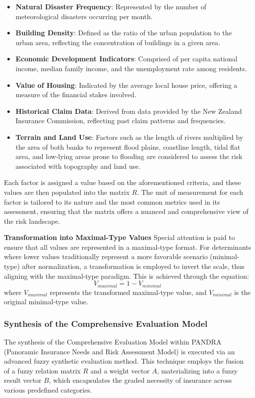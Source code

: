 \documentclass{mcmthesis}
\begin{document}
\begin{itemize}
    \item \textbf{Natural Disaster Frequency}: Represented by the number of meteorological disasters occurring per month.
    \item \textbf{Building Density}: Defined as the ratio of the urban population to the urban area, reflecting the concentration of buildings in a given area.
    \item \textbf{Economic Development Indicators}: Comprised of per capita national income, median family income, and the unemployment rate among residents.
    \item \textbf{Value of Housing}: Indicated by the average local house price, offering a measure of the financial stakes involved.
    \item \textbf{Historical Claim Data}: Derived from data provided by the New Zealand Insurance Commission, reflecting past claim patterns and frequencies.
    \item \textbf{Terrain and Land Use}: Factors such as the length of rivers multiplied by the area of both banks to represent flood plains, coastline length, tidal flat area, and low-lying areas prone to flooding are considered to assess the risk associated with topography and land use.
\end{itemize}

Each factor is assigned a value based on the aforementioned criteria, and these values are then populated into the matrix \( R \). The unit of measurement for each factor is tailored to its nature and the most common metrics used in its assessment, ensuring that the matrix offers a nuanced and comprehensive view of the risk landscape.

\textbf{Transformation into Maximal-Type Values}
Special attention is paid to ensure that all values are represented in a maximal-type format. For determinants where lower values traditionally represent a more favorable scenario (minimal-type) after normalization, a transformation is employed to invert the scale, thus aligning with the maximal-type paradigm. This is achieved through the equation:
\begin{equation}
V_{maximal} = 1 - V_{minimal}
\end{equation}
where $V_{maximal}$ represents the transformed maximal-type value, and $V_{minimal}$ is the original minimal-type value.

\subsubsection{Synthesis of the Comprehensive Evaluation Model}
The synthesis of the Comprehensive Evaluation Model within PANDRA (Panoramic Insurance Needs and Risk Assessment Model) is executed via an advanced fuzzy synthetic evaluation method. This technique employs the fusion of a fuzzy relation matrix \( R \) and a weight vector \( A \), materializing into a fuzzy result vector \( B \), which encapsulates the graded necessity of insurance across various predefined categories. 
\end{document}
